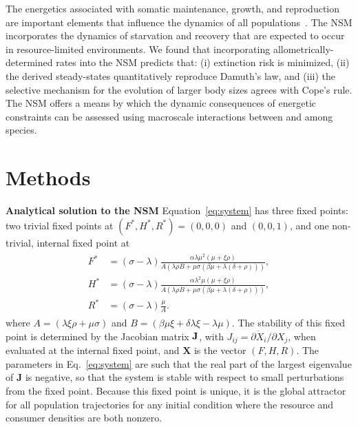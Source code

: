 \documentclass[twocolumn,preprintnumbers,amsmath,amssymb,superscriptaddress]{revtex4}
\begin{document}
\begin{bibunit}[unsrt]
  The energetics associated with somatic maintenance, growth, and reproduction
  are important elements that influence the dynamics of all
  populations~\citep{Stearns:1989ip}.  The NSM incorporates the dynamics of
  starvation and recovery that are expected to occur in resource-limited
  environments.  We found that incorporating allometrically-determined rates
  into the NSM predicts that: (i) extinction risk is minimized, (ii) the
  derived steady-states quantitatively reproduce Damuth's law, and (iii) the
  selective mechanism for the evolution of larger body sizes agrees with Cope's
  rule.  The NSM offers a means by which the dynamic consequences of energetic
  constraints can be assessed using macroscale interactions between and among
  species.




  \section*{Methods}
  \small{
  {\bf Analytical solution to the NSM}
  Equation~\eqref{eq:system} has three fixed points: two trivial fixed points at $(F^*,H^*,R^*)=(0,0,0)$ and $(0,0,1)$, and one non-trivial, internal fixed point at
  \begin{align}
  \label{eq:ss}
  \begin{split}
  F^* &= (\sigma-\lambda)\frac{ \alpha  \lambda  \mu ^2  (\mu +\xi  \rho )}{A (\lambda  \rho  B+\mu  \sigma  (\beta  \mu +\lambda  (\delta +\rho )))}, \\
  H^* &= (\sigma-\lambda)\frac{ \alpha  \lambda ^2 \mu  (\mu +\xi  \rho )}{A (\lambda  \rho  B+\mu  \sigma  (\beta  \mu +\lambda  (\delta +\rho )))}, \\
  R^* &= (\sigma - \lambda)\frac{\mu  }{A}.
  \end{split}
  \end{align}
  where $A=(\lambda \xi \rho +\mu \sigma )$ and
  $B=(\beta \mu \xi +\delta \lambda \xi -\lambda \mu )$. The stability of this
  fixed point is determined by the Jacobian matrix $\bf J$, with
  $J_{ij}=\partial{\dot X_i}/\partial{X_j}$, when evaluated at the internal
  fixed point, and $\mathbf{X}$ is the vector $(F,H,R)$.  The parameters in
  Eq.~\eqref{eq:system} are such that the real part of the largest eigenvalue
  of $\mathbf{J}$ is negative, so that the system is stable with respect to
  small perturbations from the fixed point.  Because this fixed point is
  unique, it is the global attractor for all population trajectories for any
  initial condition where the resource and consumer densities are both nonzero.

}
\end{bibunit}
\end{document}
